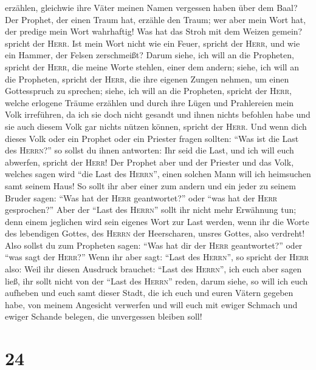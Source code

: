 erzählen, gleichwie ihre Väter meinen Namen vergessen haben über dem
Baal?  Der Prophet, der einen Traum hat, erzähle den
Traum; wer aber mein Wort hat, der predige mein Wort wahrhaftig! Was hat
das Stroh mit dem Weizen gemein? spricht der \textsc{Herr}.
 Ist mein Wort nicht wie ein Feuer, spricht der
\textsc{Herr}, und wie ein Hammer, der Felsen zerschmeißt?
 Darum siehe, ich will an die Propheten, spricht der
\textsc{Herr}, die meine Worte stehlen, einer dem andern;
 siehe, ich will an die Propheten, spricht der
\textsc{Herr}, die ihre eigenen Zungen nehmen, um einen Gottesspruch zu
sprechen;  siehe, ich will an die Propheten, spricht der
\textsc{Herr}, welche erlogene Träume erzählen und durch ihre Lügen und
Prahlereien mein Volk irreführen, da ich sie doch nicht gesandt und
ihnen nichts befohlen habe und sie auch diesem Volk gar nichts nützen
können, spricht der \textsc{Herr}.  Und wenn dich dieses
Volk oder ein Prophet oder ein Priester fragen sollten: ``Was ist die
Last des \textsc{Herrn}?'' so sollst du ihnen antworten: Ihr seid die
Last, und ich will euch abwerfen, spricht der \textsc{Herr}!
 Der Prophet aber und der Priester und das Volk, welches
sagen wird ``die Last des \textsc{Herrn}'', einen solchen Mann will ich
heimsuchen samt seinem Haus!  So sollt ihr aber einer zum
andern und ein jeder zu seinem Bruder sagen: ``Was hat der \textsc{Herr}
geantwortet?'' oder ``was hat der \textsc{Herr} gesprochen?''
 Aber der ``Last des \textsc{Herrn}'' sollt ihr nicht
mehr Erwähnung tun; denn einem jeglichen wird sein eigenes Wort zur Last
werden, wenn ihr die Worte des lebendigen Gottes, des \textsc{Herrn} der
Heerscharen, unsres Gottes, also verdreht!  Also sollst
du zum Propheten sagen: ``Was hat dir der \textsc{Herr} geantwortet?''
oder ``was sagt der \textsc{Herr}?''  Wenn ihr aber sagt:
``Last des \textsc{Herrn}'', so spricht der \textsc{Herr} also: Weil ihr
diesen Ausdruck brauchet: ``Last des \textsc{Herrn}'', ich euch aber
sagen ließ, ihr sollt nicht von der ``Last des \textsc{Herrn}'' reden,
 darum siehe, so will ich euch aufheben und euch samt
dieser Stadt, die ich euch und euren Vätern gegeben habe, von meinem
Angesicht verwerfen  und will euch mit ewiger Schmach und
ewiger Schande belegen, die unvergessen bleiben soll!

\hypertarget{section-23}{%
\section{24}\label{section-23}}

